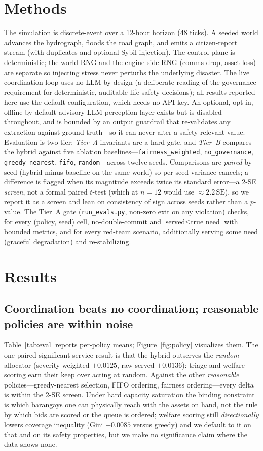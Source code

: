 \documentclass[11pt]{article}
\begin{document}
\section{Methods}
The simulation is discrete-event over a 12-hour horizon (48 ticks). A seeded world advances the
hydrograph, floods the road graph, and emits a citizen-report stream (with duplicates and optional Sybil
injection). The control plane is deterministic; the world RNG and the engine-side RNG (comms-drop, asset
loss) are separate so injecting stress never perturbs the underlying disaster. The live coordination
loop uses no LLM by design (a deliberate reading of the governance requirement for deterministic,
auditable life-safety decisions); all results reported here use the default configuration, which
needs no API key. An optional, opt-in, offline-by-default advisory LLM perception layer exists but is
disabled throughout, and is bounded by an output guardrail that re-validates any extraction against
ground truth---so it can never alter a safety-relevant value. Evaluation is two-tier:
\emph{Tier~A} invariants are a hard gate, and
\emph{Tier~B} compares the hybrid against five ablation baselines---\texttt{fairness\_weighted},
\texttt{no\_governance}, \texttt{greedy\_nearest}, \texttt{fifo}, \texttt{random}---across twelve seeds.
Comparisons are \emph{paired} by seed (hybrid minus baseline on the same world) so per-seed variance
cancels; a difference is flagged when its magnitude exceeds twice its standard error---a 2-SE
\emph{screen}, not a formal paired $t$-test (which at $n{=}12$ would use ${\approx}2.2\,\mathrm{SE}$), so
we report it as a screen and lean on consistency of sign across seeds rather than a $p$-value.
The Tier~A gate (\texttt{run\_evals.py}, non-zero exit on any violation) checks, for every
(policy, seed) cell, no-double-commit and $\text{served}\le\text{true need}$ with bounded metrics, and for
every red-team scenario, additionally serving some need (graceful degradation) and re-stabilizing.

\section{Results}
\subsection{Coordination beats no coordination; reasonable policies are within noise}
Table~\ref{tab:eval} reports per-policy means; Figure~\ref{fig:policy} visualizes them. The one
paired-significant service result is that the hybrid outserves the \emph{random} allocator
(severity-weighted $+0.0125$, raw served $+0.0136$): triage and welfare scoring earn their keep over
acting at random. Against the other \emph{reasonable} policies---greedy-nearest selection, FIFO ordering,
fairness ordering---every delta is within the 2-SE screen. Under hard capacity saturation the binding
constraint is which barangays one can physically reach with the assets on hand, not the rule by which bids
are scored or the queue is ordered; welfare scoring still \emph{directionally} lowers coverage inequality
(Gini $-0.0085$ versus greedy) and we default to it on that and on its safety properties, but we make no
significance claim where the data shows none.
\end{document}
